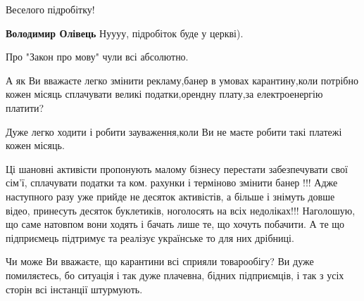 \begin{itemize}
\begin{itemize}
\begin{itemize}
 
Веселого підробітку!

 
\textbf{Володимир Олівець} Нуууу, підробіток буде у церкві).
\end{itemize}

\end{itemize}

 

Про "Закон про мову" чули всі абсолютно.

А як Ви вважаєте легко змінити рекламу,банер в умовах карантину,коли потрібно
кожен місяць сплачувати великі податки,орендну плату,за електроенергію платити?

Дуже легко ходити і робити зауваження,коли Ви не маєте робити такі платежі
кожен місяць.👿😈🤬

 

Ці шановні активісти пропонують малому бізнесу перестати забезпечувати свої
сім'ї, сплачувати податки та ком. рахунки і терміново змінити банер !!! Адже
наступного разу уже прийде не десяток активістів, а більше і знімуть довше
відео, принесуть десяток буклетиків, ноголосять на всіх недоліках!!! Наголошую,
що саме натовпом вони ходять і бачать лише те, що хочуть побачити. А те що
підприємець підтримує та реалізує українське то для них дрібниці.


 

Чи може Ви вважаєте, що карантини всі сприяли товарообігу? Ви дуже помиляєтесь, бо
ситуація і так дуже плачевна, бідних підприємців, і так з усіх сторін всі
інстанції штурмують.

\end{itemize}


